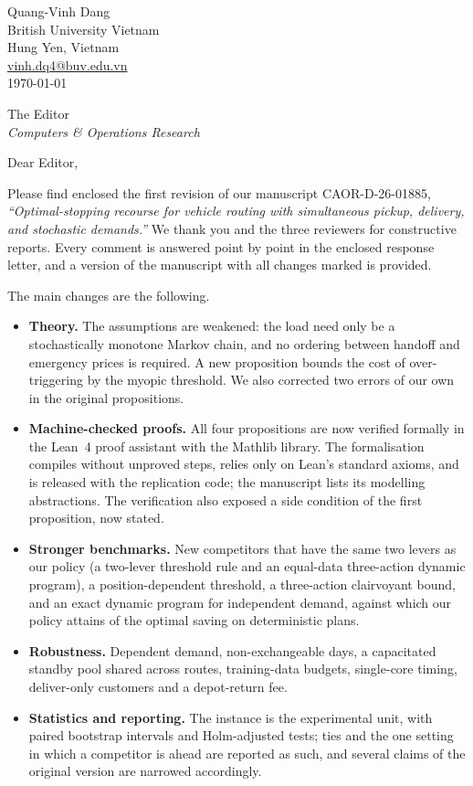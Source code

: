 \documentclass[11pt]{article}
\begin{document}
\begin{flushright}
Quang-Vinh Dang\\
British University Vietnam\\
Hung Yen, Vietnam\\
\href{mailto:vinh.dq4@buv.edu.vn}{vinh.dq4@buv.edu.vn}\\[4pt]
\today
\end{flushright}

\vspace{6pt}
\noindent
The Editor\\
\emph{Computers \& Operations Research}

\vspace{14pt}
\noindent Dear Editor,

Please find enclosed the first revision of our manuscript CAOR-D-26-01885,
\emph{``Optimal-stopping recourse for vehicle routing with simultaneous
pickup, delivery, and stochastic demands.''} We thank you and the three
reviewers for constructive reports. Every comment is answered point by
point in the enclosed response letter, and a version of the manuscript
with all changes marked is provided.

The main changes are the following.

\begin{itemize}
\item \textbf{Theory.} The assumptions are weakened: the load need only
  be a stochastically monotone Markov chain, and no ordering between
  handoff and emergency prices is required. A new proposition bounds the
  cost of over-triggering by the myopic threshold. We also corrected two
  errors of our own in the original propositions.
\item \textbf{Machine-checked proofs.} All four propositions are now
  verified formally in the Lean~4 proof assistant with the Mathlib
  library. The formalisation compiles without unproved steps, relies only
  on Lean's standard axioms, and is released with the replication code;
  the manuscript lists its modelling abstractions. The verification also
  exposed a side condition of the first proposition, now stated.
\item \textbf{Stronger benchmarks.} New competitors that have the same
  two levers as our policy (a two-lever threshold rule and an equal-data
  three-action dynamic program), a position-dependent threshold, a
  three-action clairvoyant bound, and an exact dynamic program for
  independent demand, against which our policy attains \exDetShare{} of
  the optimal saving on deterministic plans.
\item \textbf{Robustness.} Dependent demand, non-exchangeable days, a
  capacitated standby pool shared across routes, training-data budgets,
  single-core timing, deliver-only customers and a depot-return fee.
\item \textbf{Statistics and reporting.} The instance is the experimental
  unit, with paired bootstrap intervals and Holm-adjusted tests; ties and
  the one setting in which a competitor is ahead are reported as such,
  and several claims of the original version are narrowed accordingly.
\end{itemize}
\end{document}
